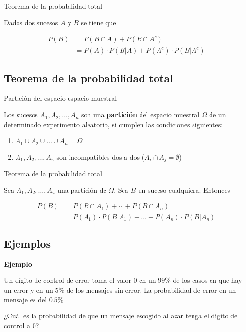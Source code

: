 \documentclass[]{book}
\providecommand{\tightlist}{%
  \setlength{\itemsep}{0pt}\setlength{\parskip}{0pt}}
\begin{document}
Teorema de la probabilidad total

Dados dos sucesos \(A\) y \(B\) se tiene que

\[
\begin{array}{rl}
P(B)&= P(B\cap A) +P(B\cap A^c)\\
& =P(A)\cdot P(B|A)+ P(A^c)\cdot P(B|A^c)
\end{array}
\]

\hypertarget{teorema-de-la-probabilidad-total-1}{%
\subsection{Teorema de la probabilidad total}\label{teorema-de-la-probabilidad-total-1}}

Partición del espacio espacio muestral

Los sucesos \(A_1,A_2,\ldots, A_n\) son una \textbf{partición} del espacio muestral \(\Omega\) de un determinado experimento aleatorio, si cumplen las condiciones siguientes:

\begin{enumerate}
\def\labelenumi{\arabic{enumi}.}
\tightlist
\item
  \(A_1\cup A_2\cup\ldots\cup A_n=\Omega\)
\item
  \(A_1,A_2,\ldots,A_n\) son incompatibles dos a dos (\(A_i\cap A_j=\emptyset\))
\end{enumerate}

Teorema de la probabilidad total

Sea \(A_1,A_2,\ldots,A_n\) una partición de \(\Omega\). Sea \(B\) un suceso cualquiera. Entonces

\[
\begin{array}{rl}
P(B)&= P(B\cap A_1)+\cdots +P(B\cap A_n)\\
& =P(A_1)\cdot P(B|A_1)+\ldots+P(A_n)\cdot P(B|A_n)
\end{array}
\]

\hypertarget{ejemplos-4}{%
\subsection{Ejemplos}\label{ejemplos-4}}

\textbf{Ejemplo}

Un dígito de control de error toma el valor 0 en un \(99\%\) de los casos en que hay un error y en un \(5\%\) de los mensajes sin error.
La probabilidad de error en un mensaje es del \(0.5\%\)

¿Cuál es la probabilidad de que un mensaje escogido al azar tenga el dígito de control a 0?
\end{document}
